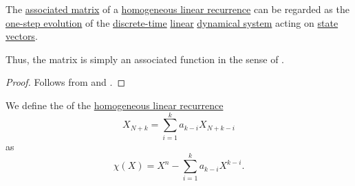 \begin{corollary}\label{thm:homogeneous_linear_recurrence_as_dynamical_system}
  The \hyperref[def:homogeneous_linear_recurrence_matrix]{associated matrix} of a \hyperref[def:homogeneous_linear_recurrence]{homogeneous linear recurrence} can be regarded as the \hyperref[def:one_step_evolution_function]{one-step evolution} of the \hyperref[def:discrete_dynamical_system]{discrete-time} \hyperref[def:linear_dynamical_system]{linear} \hyperref[def:dynamical_system]{dynamical system} acting on \hyperref[def:recurrence_relation/state]{state vectors}.
\end{corollary}
\begin{comments}
  \item Thus, the matrix is simply an associated function in the sense of .
\end{comments}
\begin{proof}
  Follows from  and .
\end{proof}

\begin{definition}\label{def:linear_recurrence_characteristic_polynomial}
  We define the  of the \hyperref[def:homogeneous_linear_recurrence]{homogeneous linear recurrence}
  \begin{equation*}
    X_{N+k} = \sum_{i=1}^k a_{k-i} X_{N+k-i}
  \end{equation*}
  as
  \begin{equation}\label{eq:def:linear_recurrence_characteristic_polynomial}
    \chi(X) = X^n - \sum_{i=1}^k a_{k-i} X^{k-i}.
  \end{equation}
\end{definition}


